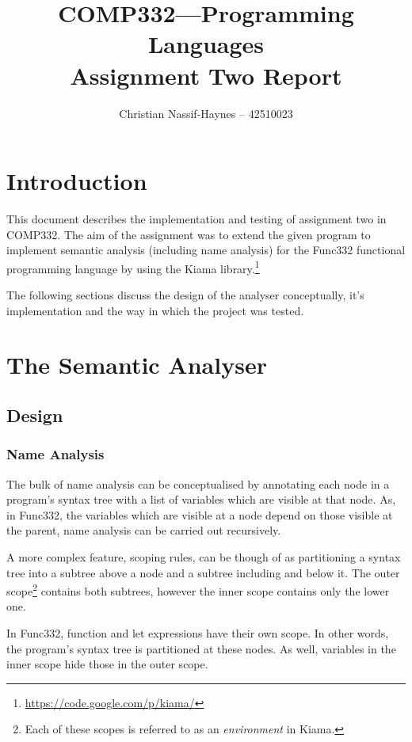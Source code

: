 \documentclass[a4paper]{article}
\begin{document}
	\begin{titlepage}
		\title{COMP332---Programming Languages \\[5pt]
		Assignment Two Report \vfill}
		\author{Christian Nassif-Haynes -- 42510023}
		\maketitle
	\end{titlepage}
	
	\section{Introduction}
	This document describes the implementation and testing of assignment two in COMP332. The aim of the assignment was to extend the given program to implement semantic analysis (including name analysis) for the Func332 functional programming language by using the Kiama library.\footnote{\url {https://code.google.com/p/kiama/}}
	
	The following sections discuss the design of the analyser conceptually, it's implementation and the way in which the project was tested.
	
	\section{The Semantic Analyser}
	\subsection{Design}
	\subsubsection{Name Analysis}
	The bulk of name analysis can be conceptualised by annotating each node in a program's syntax tree with a list of variables which are visible at that node. As, in Func332, the variables which are visible at a node depend on those visible at the parent, name analysis can be carried out recursively.
	
	A more complex feature, scoping rules, can be though of as partitioning a syntax tree into a subtree above a node and a subtree including and below it. The outer scope\footnote{Each of these scopes is referred to as an \textit{environment} in Kiama.} contains both subtrees, however the inner scope contains only the lower one.
	
	In Func332, function and let expressions have their own scope. In other words, the program's syntax tree is partitioned at these nodes. As well, variables in the inner scope hide those in the outer scope.
	
\end{document}
